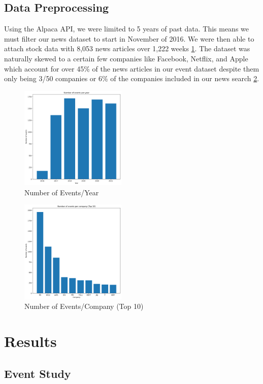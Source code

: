 \documentclass[conference]{IEEEtran}
\begin{document}
\subsection{Data Preprocessing}
Using the Alpaca API, we were limited to 5 years of past data. This means we must filter our news dataset to start in November of 2016. We were then able to attach stock data with 8,053 news articles over 1,222 weeks \ref{fig:eventsPerYear}. The dataset was naturally skewed to a certain few companies like Facebook, Netflix, and Apple which account for over 45\% of the news articles in our event dataset despite them only being 3/50 companies or 6\% of the companies included in our news search \ref{fig:eventsPerCompany}. 
\begin{figure}[ht]
    \centering
    \includegraphics[width=0.45\textwidth]{eventsPerYear.png}
    \caption{Number of Events/Year}
    \label{fig:eventsPerYear}
\end{figure}
\begin{figure}[ht]
    \centering
    \includegraphics[width=0.45\textwidth]{eventsPerCompany.png}
    \caption{Number of Events/Company (Top 10)}
    \label{fig:eventsPerCompany}
\end{figure}
\section{Results}
\subsection{Event Study}
\end{document}
